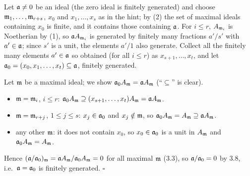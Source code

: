 \documentclass[11pt]{article}
\begin{document}
\pf
Let $\mathfrak a\ne0$ be an ideal (the zero ideal is finitely generated) and choose $\mathfrak m_1,\dots,\mathfrak m_{r+s}$, $x_0$ and $x_1,\dots,x_s$ as in the hint; by (2) the set of maximal ideals containing $x_0$ is finite, and it contains those containing $\mathfrak a$. For $i\le r$, $A_{\mathfrak m_i}$ is Noetherian by (1), so $\mathfrak a A_{\mathfrak m_i}$ is generated by finitely many fractions $a'/s'$ with $a'\in\mathfrak a$; since $s'$ is a unit, the elements $a'/1$ also generate. Collect all the finitely many elements $a'\in\mathfrak a$ so obtained (for all $i\le r$) as $x_{s+1},\dots,x_t$, and let $\mathfrak a_0=(x_0,x_1,\dots,x_t)\subseteq\mathfrak a$, finitely generated.

Let $\mathfrak m$ be a maximal ideal; we show $\mathfrak a_0A_\mathfrak m=\mathfrak a A_\mathfrak m$ (``$\subseteq$'' is clear).
\begin{itemize}[leftmargin=*]
\item $\mathfrak m=\mathfrak m_i$, $i\le r$: $\mathfrak a_0A_\mathfrak m\supseteq(x_{s+1},\dots,x_t)A_\mathfrak m=\mathfrak a A_\mathfrak m$.
\item $\mathfrak m=\mathfrak m_{r+j}$, $1\le j\le s$: $x_j\in\mathfrak a_0$ and $x_j\notin\mathfrak m$, so $\mathfrak a_0A_\mathfrak m=A_\mathfrak m\supseteq\mathfrak a A_\mathfrak m$.
\item any other $\mathfrak m$: it does not contain $x_0$, so $x_0\in\mathfrak a_0$ is a unit in $A_\mathfrak m$ and $\mathfrak a_0A_\mathfrak m=A_\mathfrak m$.
\end{itemize}
Hence $(\mathfrak a/\mathfrak a_0)_\mathfrak m=\mathfrak a A_\mathfrak m/\mathfrak a_0A_\mathfrak m=0$ for all maximal $\mathfrak m$ (3.3), so $\mathfrak a/\mathfrak a_0=0$ by 3.8, i.e.\ $\mathfrak a=\mathfrak a_0$ is finitely generated. \hfill$\square$
\end{document}

